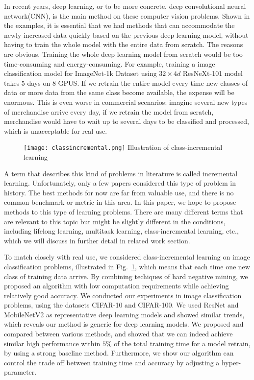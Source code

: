 In recent years, deep learning, or to be more concrete, deep convolutional neural network(CNN), is the main method on these computer vision problems. Shown in the examples, it is essential that we had methods that can accommodate the newly increased data quickly based on the previous deep learning model, without having to train the whole model with the entire data from scratch. The reasons are obvious. Training the whole deep learning model from scratch would be too time-consuming and energy-consuming. For example, training a image classification model for ImageNet-1k Dataset\cite{deng2009imagenet} using $32\times4d$ ResNeXt-101\cite{xie2017aggregated} model takes 5 days on 8 GPUS. If we retrain the entire model every time new classes of data or more data from the same class become available, the expense will be enormous. This is even worse in commercial scenarios: imagine several new types of merchandise arrive every day, if we retrain the model from scratch, merchandise would have to wait up to several days to be classified and processed, which is unacceptable for real use.
\begin{figure}[!htp]
	\centering
	\texttt{[image: classincremental.png]}
	{Illustration of class-incremental learning}
	\label{fig:classincremental}
\end{figure}
A term that describes this kind of problems in literature is called incremental learning. Unfortunately, only a few papers considered this type of problem in history. The best methods for now are far from valuable use, and there is no common benchmark or metric in this area. In this paper, we hope to propose methods to this type of learning problems. There are many different terms that are relevant to this topic but might be slightly different in the conditions, including lifelong learning, multitask learning, class-incremental learning, etc.\cite{utgoff1989incremental}, which we will discuss in further detail in related work section.

To match closely with real use, we considered class-incremental learning on image classification problems, illustrated in Fig.~\ref{fig:classincremental}, which means that each time one new class of training data arrive. By combining techiques of hard negative mining, we proposed an algorithm with low computation requirements while achieving relatively good accuracy. We conducted our experiments in image classification problems, using the datasets CIFAR-10 and CIFAR-100\cite{krizhevsky2009learning}. We used ResNet\cite{he2016deep} and MobileNetV2\cite{sandler2018inverted} as representative deep learning models and showed similar trends, which reveals our method is generic for deep learning models. We proposed and compared between various methods, and showed that we can indeed achieve similar high performance within $5\%$ of the total training time for a model retrain, by using a strong baseline method. Furthermore, we show our algorithm can control the trade off between training time and accuracy by adjusting a hyper-parameter.

